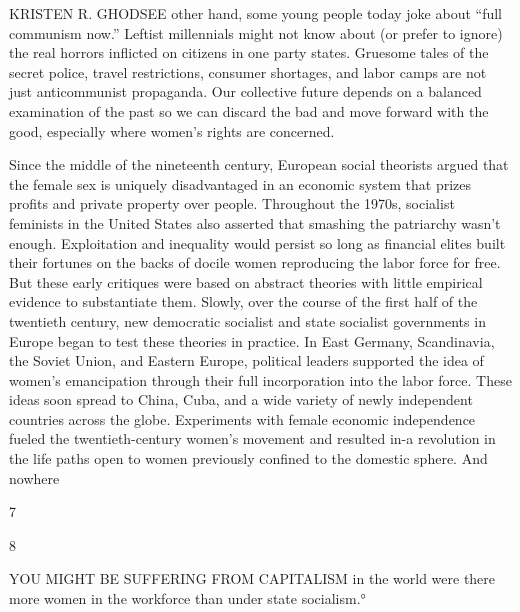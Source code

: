  \par 
KRISTEN R. GHODSEE other hand, some young people today joke about “full communism now.” Leftist millennials might not know about (or prefer to ignore) the real horrors inflicted on citizens in one party states. Gruesome tales of the secret police, travel restrictions, consumer shortages, and labor camps are not just anticommunist propaganda. Our collective future depends on a balanced examination of the past so we can discard the bad and move forward with the good, especially where women’s rights are concerned.
 \par 
Since the middle of the nineteenth century, European social theorists argued that the female sex is uniquely disadvantaged in an economic system that prizes profits and private property over people. Throughout the 1970s, socialist feminists in the United States also asserted that smashing the patriarchy wasn’t enough. Exploitation and inequality would persist so long as financial elites built their fortunes on the backs of docile women reproducing the labor force for free. But these early critiques were based on abstract theories with little empirical evidence to substantiate them. Slowly, over the course of the first half of the twentieth century, new democratic socialist and state socialist governments in Europe began to test these theories in practice. In East Germany, Scandinavia, the Soviet Union, and Eastern Europe, political leaders supported the idea of women’s emancipation through their full incorporation into the labor force. These ideas soon spread to China, Cuba, and a wide variety of newly independent countries across the globe. Experiments with female economic independence fueled the twentieth-century women’s movement and resulted in-a revolution in the life paths open to women previously confined to the domestic sphere. And nowhere
 \par 
7
 \par 
8
 \par 
YOU MIGHT BE SUFFERING FROM CAPITALISM in the world were there more women in the workforce than under state socialism.°
 \par 

